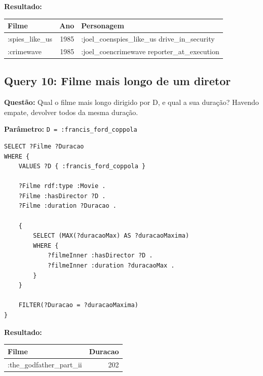 \documentclass[12pt,a4paper]{article}
\begin{document}
\textbf{Resultado:}

\begin{table}[H]
\centering
\begin{tabular}{|l|r|l|}
\hline
\textbf{Filme} & \textbf{Ano} & \textbf{Personagem} \\
\hline
:spies\_like\_us & 1985 & :joel\_coenspies\_like\_us drive\_in\_security \\
\hline
:crimewave & 1985 & :joel\_coencrimewave reporter\_at\_execution \\
\hline
\end{tabular}
\end{table}
\newpage
\subsection{Query 10: Filme mais longo de um diretor}

\textbf{Questão:} Qual o filme mais longo dirigido por D, e qual a sua duração? Havendo empate, devolver todos da mesma duração.

\textbf{Parâmetro:} \texttt{D = :francis\_ford\_coppola}

\begin{lstlisting}
SELECT ?Filme ?Duracao
WHERE {
    VALUES ?D { :francis_ford_coppola }
    
    ?Filme rdf:type :Movie .
    ?Filme :hasDirector ?D .
    ?Filme :duration ?Duracao .
    
    {
        SELECT (MAX(?duracaoMax) AS ?duracaoMaxima)
        WHERE {
            ?filmeInner :hasDirector ?D .
            ?filmeInner :duration ?duracaoMax .
        }
    }
    
    FILTER(?Duracao = ?duracaoMaxima)
}
\end{lstlisting}

\textbf{Resultado:}

\begin{table}[H]
\centering
\begin{tabular}{|l|r|}
\hline
\textbf{Filme} & \textbf{Duracao} \\
\hline
:the\_godfather\_part\_ii & 202 \\
\hline
\end{tabular}
\end{table}
\end{document}
